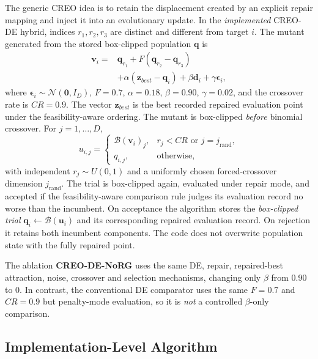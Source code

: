 \documentclass[journal]{IEEEtran}
\begin{document}
The generic CREO idea is to retain the displacement created by an explicit repair mapping and inject it into an evolutionary update. In the \emph{implemented} CREO-DE hybrid, indices $r_1,r_2,r_3$ are distinct and different from target $i$. The mutant generated from the stored box-clipped population $\mathbf{q}$ is
\begin{equation}
\begin{split}
\mathbf{v}_i={}&\mathbf{q}_{r_1}+F(\mathbf{q}_{r_2}-\mathbf{q}_{r_3})\\
&+\alpha(\mathbf{z}_{best}-\mathbf{q}_i)+\beta\mathbf{d}_i
+\gamma\boldsymbol{\epsilon}_i,
\end{split}
\label{eq:creode}
\end{equation}
where $\boldsymbol{\epsilon}_i\sim\mathcal{N}(\mathbf{0},I_D)$, $F=0.7$, $\alpha=0.18$, $\beta=0.90$, $\gamma=0.02$, and the crossover rate is $CR=0.9$. The vector $\mathbf{z}_{best}$ is the best recorded repaired evaluation point under the feasibility-aware ordering. The mutant is box-clipped \emph{before} binomial crossover. For $j=1,\ldots,D$,
\begin{equation}
  u_{i,j}=\begin{cases}
    \mathcal{B}(\mathbf{v}_i)_j,&r_j<CR\text{ or }j=j_{\mathrm{rand}},\\
    q_{i,j},&\text{otherwise},
  \end{cases}
\label{eq:crossover}
\end{equation}
with independent $r_j\sim U(0,1)$ and a uniformly chosen forced-crossover dimension $j_{\mathrm{rand}}$. The trial is box-clipped again, evaluated under repair mode, and accepted if the feasibility-aware comparison rule judges its evaluation record no worse than the incumbent. On acceptance the algorithm stores the \emph{box-clipped trial} $\mathbf{q}_i\leftarrow\mathcal{B}(\mathbf{u}_i)$ and its corresponding repaired evaluation record. On rejection it retains both incumbent components. The code does not overwrite population state with the fully repaired point.

The ablation \textbf{CREO-DE-NoRG} uses the same DE, repair, repaired-best attraction, noise, crossover and selection mechanisms, changing only $\beta$ from $0.90$ to $0$. In contrast, the conventional DE comparator uses the same $F=0.7$ and $CR=0.9$ but penalty-mode evaluation, so it is \emph{not} a controlled $\beta$-only comparison.

\subsection{Implementation-Level Algorithm}
\end{document}
